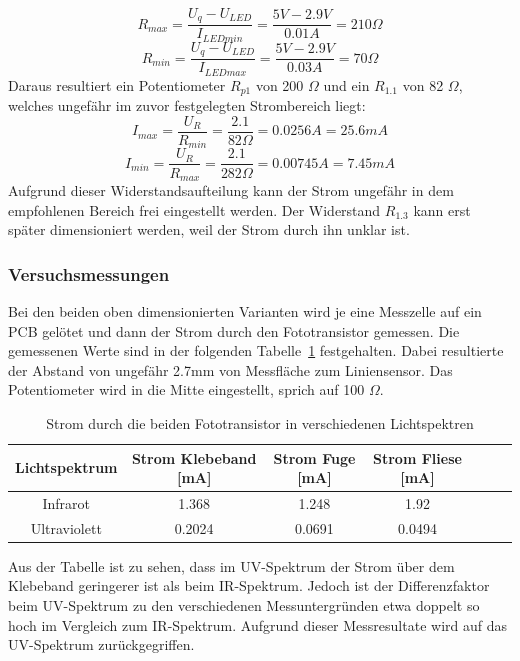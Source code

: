 \documentclass[main.tex]{subfiles} %
\begin{document}
\[
    R_{max} = \frac{U_q - U_{LED}}{I_{LEDmin}} = \frac{5 V - 2.9 V}{0.01A} = 210 \Omega
\]
\[
    R_{min} = \frac{U_q - U_{LED}}{I_{LEDmax}} = \frac{5 V - 2.9 V}{0.03A} = 70 \Omega
\]
Daraus resultiert ein Potentiometer $R_{p1}$ von 200 $\Omega$ und ein $R_{1.1}$ von 82 $\Omega$, welches ungefähr im zuvor festgelegten
Strombereich liegt:
\[
    I_{max} = \frac{U_R}{R_{min}} = \frac{2.1}{82 \Omega} = 0.0256 A = 25.6 mA
\]
\[
    I_{min} = \frac{U_R}{R_{max}} = \frac{2.1}{282 \Omega} = 0.00745 A = 7.45 mA
\]
Aufgrund dieser Widerstandsaufteilung kann der Strom ungefähr in dem empfohlenen Bereich frei eingestellt werden.
Der Widerstand $R_{1.3}$ kann erst später dimensioniert werden, weil der Strom durch ihn unklar ist.

\subsubsection*{Versuchsmessungen}
Bei den beiden oben dimensionierten Varianten wird je eine Messzelle auf ein PCB gelötet und dann der Strom durch den
Fototransistor gemessen. Die gemessenen Werte sind in der folgenden Tabelle~\ref{tab:Strommessungen_einzeln} festgehalten. Dabei resultierte der 
Abstand von ungefähr 2.7mm von Messfläche zum Liniensensor. Das Potentiometer wird in die Mitte eingestellt, sprich
auf 100 $\Omega$.

\begin{table}[h]                                    
    \centering
    \begin{tabular}{|c|c|c|c|c|c|c|}                        
        \hline
        \textbf{Lichtspektrum} & \textbf{Strom Klebeband [mA]}        & \textbf{Strom Fuge [mA]}    & \textbf{Strom Fliese [mA]}\\ \hline
        Infrarot              & 1.368                                 & 1.248                        & 1.92                       \\ \hline
        Ultraviolett          & 0.2024                                & 0.0691                       & 0.0494                     \\ \hline

        \end{tabular}
\caption{Strom durch die beiden Fototransistor in verschiedenen Lichtspektren}
\label{tab:Strommessungen_einzeln}
\end{table}


Aus der Tabelle ist zu sehen, dass im UV-Spektrum der Strom über dem Klebeband geringerer ist als beim IR-Spektrum. Jedoch ist der Differenzfaktor beim UV-Spektrum zu den 
verschiedenen Messuntergründen etwa doppelt so hoch im Vergleich zum IR-Spektrum. Aufgrund dieser Messresultate wird auf das UV-Spektrum zurückgegriffen.
\end{document}
